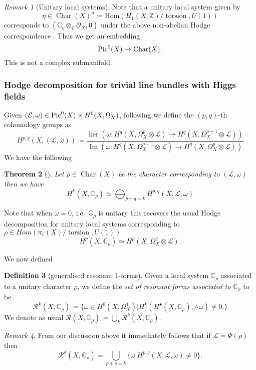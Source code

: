 \documentclass[12pt,reqno]{amsart}
\newtheorem{theorem}{Theorem}
\theoremstyle{question}
\theoremstyle{definition}
\newtheorem{definition}[theorem]{Definition}
\theoremstyle{remark}
\newtheorem{remark}[theorem]{Remark}
\theoremstyle{cited}
\theoremstyle{citeddef}
\newcommand{\Hom}{\mathrm{Hom}}
\DeclareMathOperator{\Char}{Char}
\DeclareMathOperator{\im}{Im}
\def\Pic{{\rm Pic}}
\newcommand{\sL}{\mathcal{L}}
\newcommand{\sO}{\mathcal{O}}
\newcommand{\sR}{\mathcal{R}}
\newcommand{\bbC}{\mathbb{C}}
\newcommand{\bbZ}{\mathbb{Z}}
\DeclareMathOperator{\torsion}{torsion}
\begin{document}
\begin{remark}[Unitary local systems]
Note that a unitary local system given by
\[\eta\in\Char(X)^u \coloneqq \Hom(H_1(X,\bbZ)/\torsion , U(1))\]
corresponds to $(\bbC_{\eta}\otimes_{\bbC}\sO_X, 0)$
under the above non-abelian Hodge correspondence \cite{Sim91}. Thus
we get an embedding 
\[\Pic^0(X) \to \Char(X).\]
This is not a complex submanifold.
\end{remark}


\subsubsection{Hodge decomposition for trivial line bundles with Higgs fields}
Given $(\sL, \omega)\in \Pic^0(X)\times H^0(X,\Omega_X^1)$, following \cite{Ara92} we define the $(p,q)$-th cohomology groups as
\[H^{p,q}(X, (\sL, \omega)) \coloneqq 
\frac{\ker\left(\omega\colon H^q(X, \Omega_X^p\otimes \sL)
\to H^q(X, \Omega_X^{p+1}\otimes\sL)\right)}{\im\left(\omega\colon
H^q(X,\Omega_X^{p-1}\otimes\sL)\to H^q(X,\Omega_X^{p}\otimes\sL)\right)}\]
We have the following 
\begin{theorem}[{\cite[Theorem 3]{Ara92}}]
Let $\rho\in \Char(X)$ be the character corresponding to 
$(\sL,\omega)$ then we have
\[H^k(X, \bbC_{\rho}) \simeq \bigoplus_{p+q =k}H^{p,q}(X,\sL,\omega)\]
\label{thm:genhodgedecomp}
\end{theorem}

Note that when $\omega = 0$, i.e.\ $\bbC_{\rho}$ is unitary
this recovers the usual Hodge decomposition for 
unitary local systems corresponding to $\rho \in Hom(\pi_1(X)/\torsion, U(1))$
\[H^p(X, \bbC_{\rho}) \simeq H^p(X, \Omega_X^q\otimes\sL).\]

We now defined
\begin{definition}[generalised resonant 1-forms]
Given a local system $\bbC_{\rho}$ associated to a unitary character $\rho$, we define
the \textsl{set of resonant forms associated to $\bbC_{\rho}$} to be
\[\sR^k(X, \bbC_{\rho}) \coloneqq
\{\omega\in H^0(X, \Omega_X^1)| H^k(H^{\bullet}(X, \bbC_{\rho}), \wedge\omega) \neq 0 .\}\]
We denote as usual 
$\sR(X, \bbC_{\rho}) \coloneqq \bigcup_k \sR^k(X, \bbC_{\rho})$.
\end{definition}

\begin{remark}
From our discussion above it immediately follows that
if $\sL = \Psi(\rho)$ then
\[\sR^k(X, \bbC_{\rho}) =\bigcup_{p+q = k} \{\omega| H^{p,q}(X, \sL,\omega) \neq 0\}.\]
\end{remark}
\end{document}
